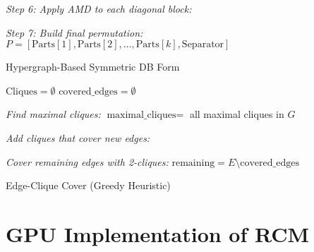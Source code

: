 \begin{algorithm}[H]
    \emph{Step 6: Apply AMD to each diagonal block:}\;
    \BlankLine

    \emph{Step 7: Build final permutation:}\;
    $P = [\text{Parts}[1], \text{Parts}[2], \ldots, \text{Parts}[k], \text{Separator}]$\;

    \;

    \caption{Hypergraph-Based Symmetric DB Form}
    \label{alg:hypergraph_db}
\end{algorithm}

\begin{algorithm}[H]

    \BlankLine

    $\text{Cliques} = \emptyset$\;
    $\text{covered\_edges} = \emptyset$\;
    \BlankLine

    \emph{Find maximal cliques:}\;
    $\text{maximal\_cliques} = $ all maximal cliques in $G$\;
    \BlankLine

    \emph{Add cliques that cover new edges:}\;
    \BlankLine

    \emph{Cover remaining edges with 2-cliques:}\;
    $\text{remaining} = E \setminus \text{covered\_edges}$\;

    \;

    \caption{Edge-Clique Cover (Greedy Heuristic)}
    \label{alg:edge_clique_cover}
\end{algorithm}

\section{GPU Implementation of RCM}

